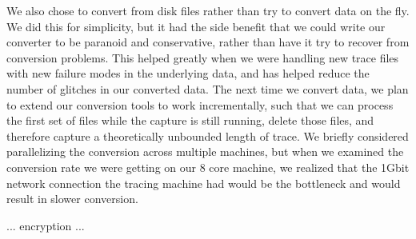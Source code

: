 We also chose to convert from disk files rather than try to convert
data on the fly.  We did this for simplicity, but it had the side
benefit that we could write our converter to be paranoid and
conservative, rather than have it try to recover from conversion
problems.  This helped greatly when we were handling new trace files
with new failure modes in the underlying data, and has helped reduce
the number of glitches in our converted data.  The next time we
convert data, we plan to extend our conversion tools to work
incrementally, such that we can process the first set of files while
the capture is still running, delete those files, and therefore
capture a theoretically unbounded length of trace.  We briefly
considered parallelizing the conversion across multiple machines, but
when we examined the conversion rate we were getting on our 8 core
machine, we realized that the 1Gbit network connection the tracing
machine had would be the bottleneck and would result in slower
conversion.

... encryption ...



